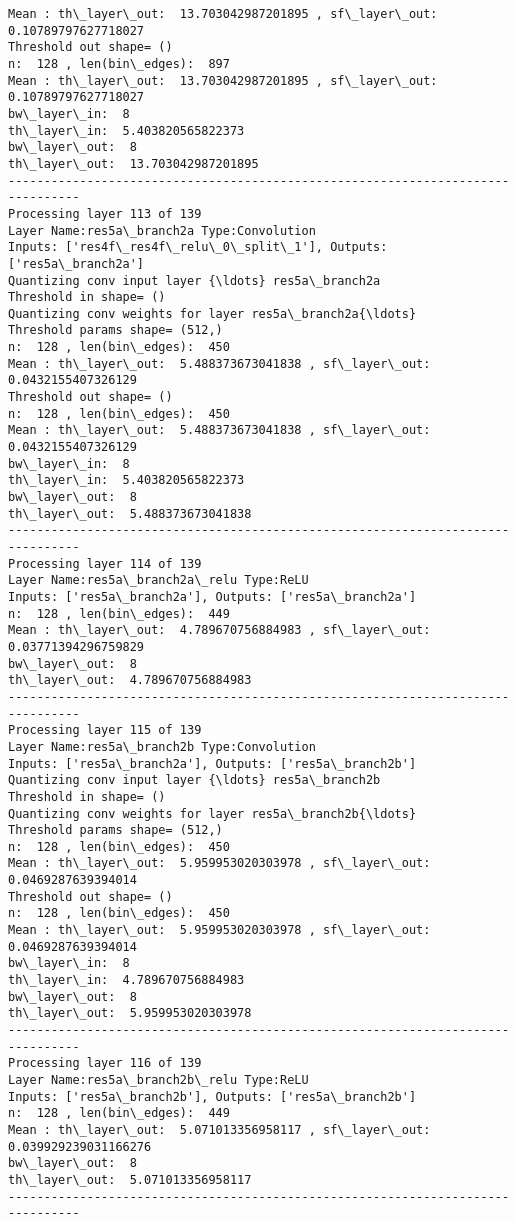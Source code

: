 \documentclass[11pt]{article}
\begin{document}
\begin{Verbatim}[commandchars=\\\{\}]
Mean : th\_layer\_out:  13.703042987201895 , sf\_layer\_out:  0.10789797627718027
Threshold out shape= ()
n:  128 , len(bin\_edges):  897
Mean : th\_layer\_out:  13.703042987201895 , sf\_layer\_out:  0.10789797627718027
bw\_layer\_in:  8
th\_layer\_in:  5.403820565822373
bw\_layer\_out:  8
th\_layer\_out:  13.703042987201895
--------------------------------------------------------------------------------
Processing layer 113 of 139
Layer Name:res5a\_branch2a Type:Convolution
Inputs: ['res4f\_res4f\_relu\_0\_split\_1'], Outputs: ['res5a\_branch2a']
Quantizing conv input layer {\ldots} res5a\_branch2a
Threshold in shape= ()
Quantizing conv weights for layer res5a\_branch2a{\ldots}
Threshold params shape= (512,)
n:  128 , len(bin\_edges):  450
Mean : th\_layer\_out:  5.488373673041838 , sf\_layer\_out:  0.0432155407326129
Threshold out shape= ()
n:  128 , len(bin\_edges):  450
Mean : th\_layer\_out:  5.488373673041838 , sf\_layer\_out:  0.0432155407326129
bw\_layer\_in:  8
th\_layer\_in:  5.403820565822373
bw\_layer\_out:  8
th\_layer\_out:  5.488373673041838
--------------------------------------------------------------------------------
Processing layer 114 of 139
Layer Name:res5a\_branch2a\_relu Type:ReLU
Inputs: ['res5a\_branch2a'], Outputs: ['res5a\_branch2a']
n:  128 , len(bin\_edges):  449
Mean : th\_layer\_out:  4.789670756884983 , sf\_layer\_out:  0.03771394296759829
bw\_layer\_out:  8
th\_layer\_out:  4.789670756884983
--------------------------------------------------------------------------------
Processing layer 115 of 139
Layer Name:res5a\_branch2b Type:Convolution
Inputs: ['res5a\_branch2a'], Outputs: ['res5a\_branch2b']
Quantizing conv input layer {\ldots} res5a\_branch2b
Threshold in shape= ()
Quantizing conv weights for layer res5a\_branch2b{\ldots}
Threshold params shape= (512,)
n:  128 , len(bin\_edges):  450
Mean : th\_layer\_out:  5.959953020303978 , sf\_layer\_out:  0.0469287639394014
Threshold out shape= ()
n:  128 , len(bin\_edges):  450
Mean : th\_layer\_out:  5.959953020303978 , sf\_layer\_out:  0.0469287639394014
bw\_layer\_in:  8
th\_layer\_in:  4.789670756884983
bw\_layer\_out:  8
th\_layer\_out:  5.959953020303978
--------------------------------------------------------------------------------
Processing layer 116 of 139
Layer Name:res5a\_branch2b\_relu Type:ReLU
Inputs: ['res5a\_branch2b'], Outputs: ['res5a\_branch2b']
n:  128 , len(bin\_edges):  449
Mean : th\_layer\_out:  5.071013356958117 , sf\_layer\_out:  0.039929239031166276
bw\_layer\_out:  8
th\_layer\_out:  5.071013356958117
--------------------------------------------------------------------------------

\end{Verbatim}
\end{document}
